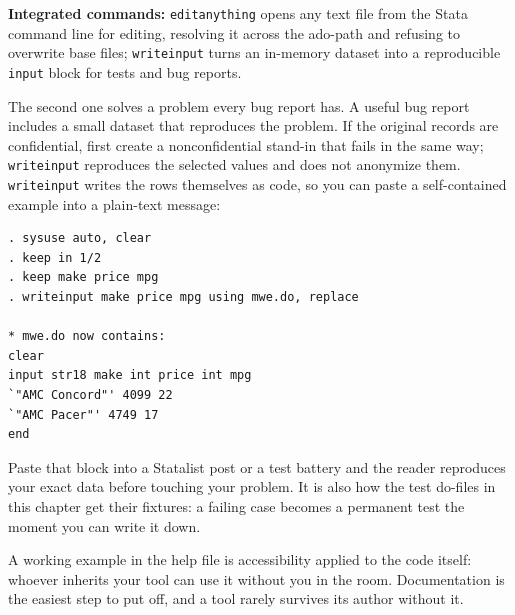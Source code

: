 \documentclass[
    a4paper,
    fontsize=10pt,
    twoside=true,
    numbers=noenddot,
]{kaobook}
\begin{document}
\begin{kaobox}[frametitle=Package Integration: \texttt{editanything} and \texttt{writeinput}]
\textbf{Integrated commands:} \texttt{editanything} opens any text file from the Stata command line for editing, resolving it across the ado-path and refusing to overwrite base files; \texttt{writeinput} turns an in-memory dataset into a reproducible \texttt{input} block for tests and bug reports.

The second one solves a problem every bug report has. A useful bug report includes a small dataset that reproduces the problem. If the original records are confidential, first create a nonconfidential stand-in that fails in the same way; \texttt{writeinput} reproduces the selected values and does not anonymize them. \texttt{writeinput} writes the rows themselves as code, so you can paste a self-contained example into a plain-text message:
\par
{\footnotesize
\begin{verbatim}
. sysuse auto, clear
. keep in 1/2
. keep make price mpg
. writeinput make price mpg using mwe.do, replace

* mwe.do now contains:
clear
input str18 make int price int mpg
`"AMC Concord"' 4099 22
`"AMC Pacer"' 4749 17
end
\end{verbatim}
}
Paste that block into a Statalist post or a test battery and the reader reproduces your exact data before touching your problem. It is also how the test do-files in this chapter get their fixtures: a failing case becomes a permanent test the moment you can write it down.
\end{kaobox}

A working example in the help file is accessibility applied to the code itself: whoever inherits your tool can use it without you in the room. Documentation is the easiest step to put off, and a tool rarely survives its author without it.
\end{document}

